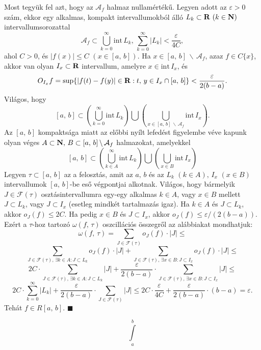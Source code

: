 Most tegyük fel azt, hogy az $\mathcal{A}_f$ halmaz nullamértékű. Legyen adott az $\varepsilon > 0$ szám, ekkor egy alkalmas, kompakt intervallumokból álló $L_k \subset \mathbf{R} \, \, (k \in \mathbf{N})$ intervallumsorozattal
\[
	\mathcal{A}_f \subset \bigcup_{k=0}^\infty \text{int} \, L_k, \, \sum_{k=0}^\infty |L_k| <\frac{\varepsilon}{4C},
\]
ahol $C >0$, és $|f(x)| \leq C \, \, (x \in [a, \, b])$. Ha $x \in [a, \, b] \, \backslash \, \mathcal{A}_f$, azaz $f \in C\{x\}$, akkor van olyan $I_x \subset \mathbf{R}$ intervallum, amelyre $x \in \text{int} \, I_x$, és
\[
	O_{I_x}f = \sup\{ |f(t) - f(y)| \in \mathbf{R} : t, \, y \in I_x \cap [a, \, b]\} < \frac{\varepsilon}{2(b-a)}.
\]
Világos, hogy
\[
	[a, \, b] \subset \left(\bigcup_{k=0}^\infty \text{int} \, L_k\right) \bigcup \left(\bigcup_{x \in [a, \, b] \, \backslash \, \mathcal{A}_f} \text{int} \, I_x\right).
\]
Az $[a, \, b]$ kompaktsága miatt az előbbi nyílt lefedést figyelembe véve kapunk olyan véges $A \subset \mathbf{N}, \, B \subset [a, \, b] \, \backslash \, \mathcal{A}_f$ halmazokat, amelyekkel
\[
	[a, \, b] \subset \left(\bigcup_{k \in A}^\infty \text{int} \, L_k\right) \bigcup \left(\bigcup_{x \in B} \text{int} \, I_x\right)
\]
Legyen $\tau \subset [a, \, b]$ az a felosztás, amit az $a, \, b$ és az $L_k \, \, (k \in A), \, I_x \, \, (x \in B)$ intervallumok $[a, \, b]$-be eső végpontjai alkotnak. Világos, hogy bármelyik $J \in \mathcal{F}(\tau)$ osztásintervallumra egy-egy alkalmas $k \in A$, vagy $x \in B$ mellett $J \subset L_k$, vagy $J \subset I_x$ (esetleg mindkét tartalmazás igaz). Ha $k \in A$ és $J \subset L_k$, akkor $o_J(f) \leq 2C$. Ha pedig $x \in B$ és $J \subset I_x$, akkor $o_J(f) \leq \varepsilon / (2(b-a))$. Ezért a $\tau$-hoz tartozó $\omega(f, \, \tau)$ oszcillációs összegről az alábbiakat mondhatjuk:
\[
	\omega(f, \, \tau) = \sum_{J \in \mathcal{F}(\tau) } o_J(f) \cdot |J| \leq
\]
\[
	\sum_{J \in \mathcal{F}(\tau), \, \exists k \in A : J \subset L_k} o_J(f) \cdot |J| + \sum_{J \in \mathcal{F}(\tau), \, \exists x \in B : J \subset I_x} o_J(f) \cdot |J| \leq
\]
\[
	2C \cdot \sum_{J \in \mathcal{F}(\tau), \, \exists k \in A : J \subset L_k} |J| + \frac{\varepsilon}{2(b-a)} \cdot \sum_{J \in \mathcal{F}(\tau), \, \exists x \in B : J \subset I_x} |J| \leq
\]
\[
	2C \cdot \sum_{k=0}^\infty |L_k| + \frac{\varepsilon}{2(b-a)} \cdot \sum_{J \in \mathcal{F}(\tau)} |J| \leq 2C \cdot \frac{\varepsilon}{4C} + \frac{\varepsilon}{2(b-a)} \cdot (b-a) = \varepsilon.
\]
Tehát $f \in R[a, \, b]$. $\blacksquare$

\[
	\int\limits_a^b
\]